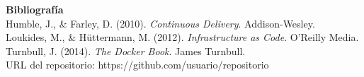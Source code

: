 \documentclass[12pt,letterpaper]{article}
\begin{document}
\textbf{Bibliografía} \\
Humble, J., & Farley, D. (2010). \textit{Continuous Delivery}. Addison-Wesley. \\
Loukides, M., & Hüttermann, M. (2012). \textit{Infrastructure as Code}. O'Reilly Media. \\
Turnbull, J. (2014). \textit{The Docker Book}. James Turnbull. \\

URL del repositorio: https://github.com/usuario/repositorio 

\end{document}
